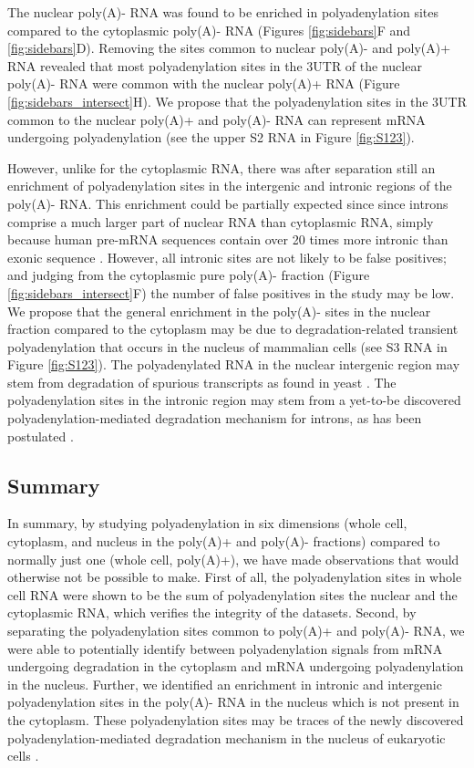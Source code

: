 The nuclear poly(A)- RNA was found to be enriched in polyadenylation sites
compared to the cytoplasmic poly(A)- RNA (Figures \ref{fig:sidebars}F and
\ref{fig:sidebars}D). Removing the sites common to nuclear poly(A)- and
poly(A)+ RNA revealed that most polyadenylation sites in the 3\ppp UTR of the
nuclear poly(A)- RNA were common with the nuclear poly(A)+ RNA (Figure
\ref{fig:sidebars_intersect}H). We propose that the polyadenylation sites in
the 3\ppp UTR common to the nuclear poly(A)+ and poly(A)- RNA can represent
mRNA undergoing polyadenylation (see the upper S2 RNA in Figure
\ref{fig:S123}).

However, unlike for the cytoplasmic RNA, there was after separation still an
enrichment of polyadenylation sites in the intergenic and intronic regions of
the poly(A)- RNA. This enrichment could be partially expected since since
introns comprise a much larger part of nuclear RNA than cytoplasmic RNA, simply
because human pre-mRNA sequences contain over 20 times more intronic than
exonic sequence \cite{venter_sequence_2001}. However, all intronic sites are
not likely to be false positives; and judging from the cytoplasmic pure
poly(A)- fraction (Figure \ref{fig:sidebars_intersect}F) the number of false
positives in the study may be low. We propose that the general enrichment in
the poly(A)- sites in the nuclear fraction compared to the cytoplasm may be due
to degradation-related transient polyadenylation that occurs in the nucleus of
mammalian cells \cite{lemay_nuclear_2010} (see S3 RNA in Figure \ref{fig:S123}).
The polyadenylated RNA in the nuclear intergenic region may stem from
degradation of spurious transcripts as found in yeast
\cite{wyers_cryptic_2005}. The polyadenylation sites in the intronic region may
stem from a yet-to-be discovered polyadenylation-mediated degradation mechanism
for introns, as has been postulated \cite{schmidt_polyadenylation_2010}.

\subsection{Summary}
In summary, by studying polyadenylation in six dimensions (whole cell,
cytoplasm, and nucleus in the poly(A)+ and poly(A)- fractions) compared to
normally just one (whole cell, poly(A)+), we have made observations that would
otherwise not be possible to make. First of all, the polyadenylation sites in
whole cell RNA were shown to be the sum of polyadenylation sites the nuclear
and the cytoplasmic RNA, which verifies the integrity of the datasets. Second,
by separating the polyadenylation sites common to poly(A)+ and poly(A)- RNA, we
were able to potentially identify between polyadenylation signals from mRNA
undergoing degradation in the cytoplasm and mRNA undergoing polyadenylation in
the nucleus. Further, we identified an enrichment in intronic and intergenic
polyadenylation sites in the poly(A)- RNA in the nucleus which is not present
in the cytoplasm. These polyadenylation sites may be traces of the newly
discovered polyadenylation-mediated degradation mechanism in the nucleus of
eukaryotic cells \cite{lemay_nuclear_2010}.  

